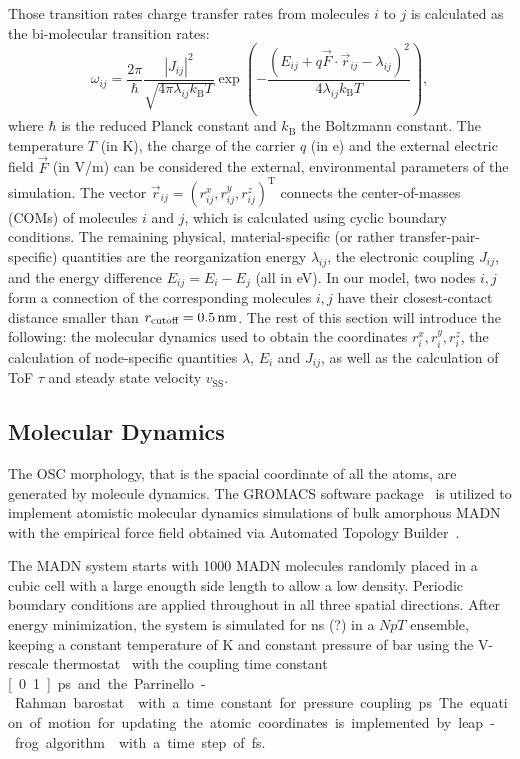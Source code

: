 \documentclass[%
 reprint,
 amsmath,amssymb,
 aps,
]{revtex4-2}
\begin{document}
Those transition rates charge transfer rates from molecules $i$ to $j$ is calculated as the bi-molecular transition rates:
%
\begin{equation}
    \omega_{ij} = \frac{2\pi}{\hbar} \frac{|J_{ij}|^2}{\sqrt{4\pi \lambda_{ij} k_\text{B}T}} \exp\left(-\frac{(E_{ij} + q \vec{F} \cdot \vec{r}_{ij} - \lambda_{ij})^2}{4\lambda_{ij} k_\text{B}T}\right) ,
    \label{equ:Marcus}
\end{equation}
%
where $\hbar$ is the reduced Planck constant and $k_\text{B}$ the Boltzmann constant. The temperature $T$ (in \unit[]{K}), the charge of the carrier $q$ (in \unit[]{e}) and the external electric field $\vec{F}$ (in V/m) can be considered the external, environmental parameters of the simulation. The vector $\vec{r}_{ij} = (r^x_{ij},r^y_{ij},r^z_{ij})^\text{T}$ connects the center-of-masses (COMs) of molecules $i$ and $j$, which is calculated using cyclic boundary conditions. 
The remaining physical, material-specific (or rather transfer-pair-specific) quantities are the reorganization energy $\lambda_{ij}$, the electronic coupling $J_{ij}$, and the energy difference $E_{ij} = E_i - E_j$ (all in \unit[]{eV}). 
In our model, two nodes $i,j$ form a connection of the corresponding molecules $i,j$ have their closest-contact distance smaller than $r_\text{cutoff}=\unit[0.5]{nm}$.
The rest of this section will introduce the following: the molecular dynamics used to obtain the coordinates $r^x_{i},r^y_{i},r^z_{i}$, the calculation of node-specific quantities $\lambda$, $E_i$ and $J_{ij}$, as well as the calculation of ToF $\tau$ and steady state velocity $v_\text{SS}$.

\subsection{Molecular Dynamics}
The OSC morphology, that is the spacial coordinate of all the atoms, are generated by molecule dynamics. The GROMACS software package~\cite{berendsen_gromacs_1995} is utilized to implement atomistic molecular dynamics simulations of bulk amorphous MADN with the empirical force field obtained via Automated Topology Builder~\cite{stroet_automated_2018}.

The MADN system starts with 1000 MADN molecules randomly placed in a cubic cell with a large enougth side length to allow a low density. Periodic boundary conditions are applied throughout in all three spatial directions. After energy minimization, the system is simulated for \unit[1]{ns} (?) in a $NpT$ ensemble, keeping a constant temperature of \unit[300]{K} and constant pressure of \unit[1]{bar} using the V-rescale thermostat~\cite{bussi_canonical_2007} with the coupling time constant \unit[0.1]{ps} and the Parrinello-Rahman barostat~\cite{parrinello_polymorphic_1981} with a time constant for pressure coupling \unit[2]{ps}. 
The equation of motion for updating the atomic coordinates is implemented by leap-frog algorithm~\cite{van_gunsteren_leap} with a time step of \unit[1]{fs}. 
\end{document}
